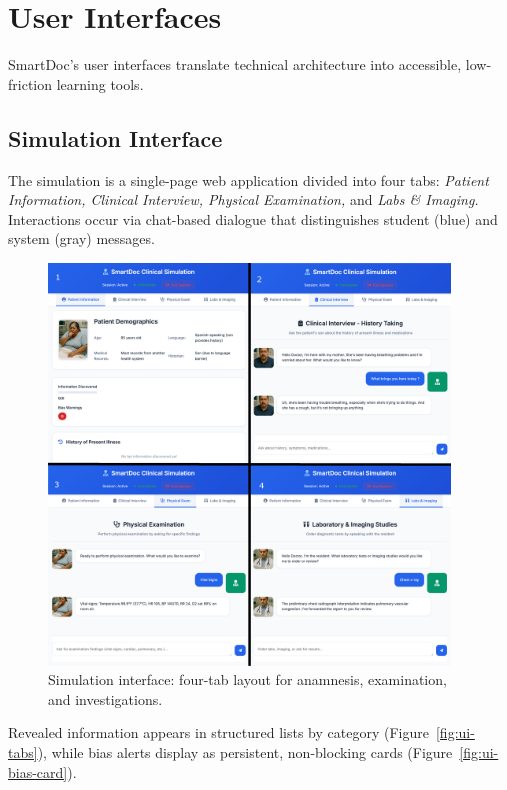 \newpage
\section{User Interfaces}
\label{sec:ui}

SmartDoc’s user interfaces translate technical architecture into accessible,
low-friction learning tools.

\subsection{Simulation Interface}

The simulation is a single-page web application divided into four tabs:
\textit{Patient Information, Clinical Interview, Physical Examination,} and
\textit{Labs \& Imaging.}
Interactions occur via chat-based dialogue that distinguishes student (blue) and
system (gray) messages.

\begin{figure}[h]
  \centering
  \includegraphics[width=0.95\textwidth]{figures/ui/ui_layout_overview.png}
  \caption{Simulation interface: four-tab layout for anamnesis, examination, and investigations.}
  \label{fig:ui-layout}
\end{figure}

\newpage

Revealed information appears in structured lists by category
(Figure~\ref{fig:ui-tabs}), while bias alerts display as persistent,
non-blocking cards (Figure~\ref{fig:ui-bias-card}).

